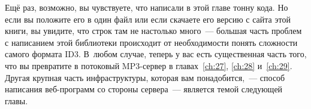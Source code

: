 Ещё раз, возможно, вы чувствуете, что написали в этой главе тонну кода. Но если вы положите
его в один файл или если скачаете его версию с сайта этой книги, вы увидите, что строк там
не настолько много~--- большая часть проблем с написанием этой библиотеки происходит от
необходимости понять сложности самого формата ID3. В~любом случае, теперь у вас есть
существенная часть того, что вы превратите в потоковый MP3-сервер в главах~\ref{ch:27},
\ref{ch:28} и~\ref{ch:29}. Другая крупная часть инфраструктуры, которая вам
понадобится,~--- способ написания веб-программ со стороны сервера~--- является темой следующей
главы.

